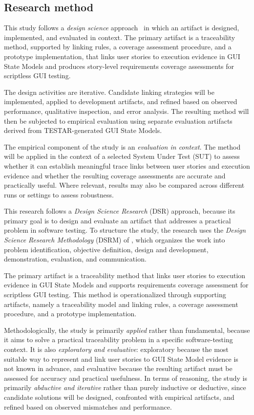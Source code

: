 \subsection{Research method}
\label{subsec:research-method}

This study follows a \emph{design science} approach~\citep{peffers2007design} in which an artifact is designed, implemented, and evaluated in context. The primary artifact is a traceability method, supported by linking rules, a coverage assessment procedure, and a prototype implementation, that links user stories to execution evidence in GUI State Models and produces story-level requirements coverage assessments for scriptless GUI testing.

The design activities are iterative. Candidate linking strategies will be implemented, applied to development artifacts, and refined based on observed performance, qualitative inspection, and error analysis. The resulting method will then be subjected to empirical evaluation using separate evaluation artifacts derived from TESTAR-generated GUI State Models.

The empirical component of the study is an \emph{evaluation in context}. The method will be applied in the context of a selected System Under Test (SUT) to assess whether it can establish meaningful trace links between user stories and execution evidence and whether the resulting coverage assessments are accurate and practically useful. Where relevant, results may also be compared across different runs or settings to assess robustness.



This research follows a \emph{Design Science Research} (DSR) approach, because its primary goal is to design and evaluate an artifact that addresses a practical problem in software testing. To structure the study, the research uses the \emph{Design Science Research Methodology} (DSRM) of \citet{peffers2007design}, which organizes the work into problem identification, objective definition, design and development, demonstration, evaluation, and communication.

The primary artifact is a traceability method that links user stories to execution evidence in GUI State Models and supports requirements coverage assessment for scriptless GUI testing. This method is operationalized through supporting artifacts, namely a traceability model and linking rules, a coverage assessment procedure, and a prototype implementation.

Methodologically, the study is primarily \emph{applied} rather than fundamental, because it aims to solve a practical traceability problem in a specific software-testing context. It is also \emph{exploratory and evaluative}: exploratory because the most suitable way to represent and link user stories to GUI State Model evidence is not known in advance, and evaluative because the resulting artifact must be assessed for accuracy and practical usefulness. In terms of reasoning, the study is primarily \emph{abductive and iterative} rather than purely inductive or deductive, since candidate solutions will be designed, confronted with empirical artifacts, and refined based on observed mismatches and performance.

